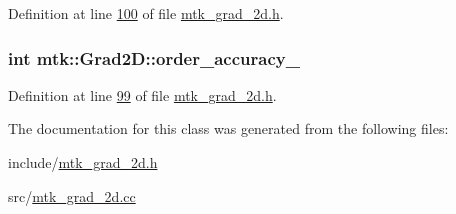 Definition at line \hyperlink{mtk__grad__2d_8h_source_l00100}{100} of file \hyperlink{mtk__grad__2d_8h_source}{mtk\-\_\-grad\-\_\-2d.\-h}.

\hypertarget{classmtk_1_1Grad2D_ab028aa2889a2f5d59f52e01691b1b9eb}{
\subsubsection[{order\-\_\-accuracy\-\_\-}]{\setlength{\rightskip}{0pt plus 5cm}int mtk\-::\-Grad2\-D\-::order\-\_\-accuracy\-\_\-\hspace{0.3cm}{\ttfamily [private]}}}\label{classmtk_1_1Grad2D_ab028aa2889a2f5d59f52e01691b1b9eb}


Definition at line \hyperlink{mtk__grad__2d_8h_source_l00099}{99} of file \hyperlink{mtk__grad__2d_8h_source}{mtk\-\_\-grad\-\_\-2d.\-h}.



The documentation for this class was generated from the following files\-:\begin{DoxyCompactItemize}
\item 
include/\hyperlink{mtk__grad__2d_8h}{mtk\-\_\-grad\-\_\-2d.\-h}\item 
src/\hyperlink{mtk__grad__2d_8cc}{mtk\-\_\-grad\-\_\-2d.\-cc}\end{DoxyCompactItemize}
